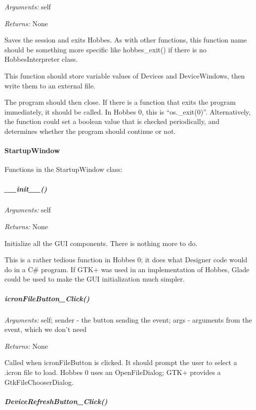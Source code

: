 \documentclass[12pt,letterpaper]{article}
\begin{document}
\emph{Arguments:} self

\emph{Returns:} None

Saves the session and exits Hobbes. As with other functions, this function name should be something more specific like hobbes\_exit() if there is no HobbesInterpreter class.

This function should store variable values of Devices and DeviceWindows, then write them to an external file.

The program should then close. If there is a function that exits the program immediately, it should be called. In Hobbes 0, this is ``os.\_exit(0)''. Alternatively, the function could set a boolean value that is checked periodically, and determines whether the program should continue or not.



%
%
\paragraph{StartupWindow}
\label{4.1.1.1}

Functions in the StartupWindow class:

\setcounter{subparagraph}{-1}



%
%
\subparagraph{\_\_init\_\_()}
\label{4.1.1.1.0}

\emph{Arguments:} self

\emph{Returns:} None

Initialize all the GUI components. There is nothing more to do.

This is a rather tedious function in Hobbes 0; it does what Designer code would do in a C\# program. If GTK+ was used in an implementation of Hobbes, Glade could be used to make the GUI initialization much simpler.



%
%
\subparagraph{icronFileButton\_Click()}
\label{4.1.1.1.1}

\emph{Arguments:} self; sender - the button sending the event; args - arguments from the event, which we don't need

\emph{Returns:} None

Called when icronFileButton is clicked. It should prompt the user to select a .icron file to load. Hobbes 0 uses an OpenFileDialog; GTK+ provides a GtkFileChooserDialog.



%
%
\subparagraph{DeviceRefreshButton\_Click()}
\label{4.1.1.1.2}
\end{document}
